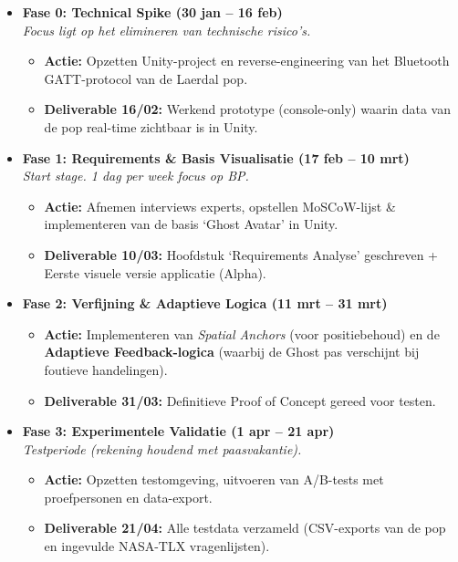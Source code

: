 \begin{itemize}
    \item \textbf{Fase 0: Technical Spike (30 jan -- 16 feb)} \\
    \textit{Focus ligt op het elimineren van technische risico's.}
    \begin{itemize}
        \item \textbf{Actie:} Opzetten Unity-project en reverse-engineering van het Bluetooth GATT-protocol van de Laerdal pop.
        \item \textbf{Deliverable 16/02:} Werkend prototype (console-only) waarin data van de pop real-time zichtbaar is in Unity.
    \end{itemize}

    \item \textbf{Fase 1: Requirements \& Basis Visualisatie (17 feb -- 10 mrt)} \\
    \textit{Start stage. 1 dag per week focus op BP.}
    \begin{itemize}
        \item \textbf{Actie:} Afnemen interviews experts, opstellen MoSCoW-lijst \& implementeren van de basis `Ghost Avatar' in Unity.
        \item \textbf{Deliverable 10/03:} Hoofdstuk `Requirements Analyse' geschreven + Eerste visuele versie applicatie (Alpha).
    \end{itemize}

    \item \textbf{Fase 2: Verfijning \& Adaptieve Logica (11 mrt -- 31 mrt)}
    \begin{itemize}
        \item \textbf{Actie:} Implementeren van \textit{Spatial Anchors} (voor positiebehoud) en de \textbf{Adaptieve Feedback-logica} (waarbij de Ghost pas verschijnt bij foutieve handelingen).
        \item \textbf{Deliverable 31/03:} Definitieve Proof of Concept gereed voor testen.
    \end{itemize}

    \item \textbf{Fase 3: Experimentele Validatie (1 apr -- 21 apr)} \\
    \textit{Testperiode (rekening houdend met paasvakantie).}
    \begin{itemize}
        \item \textbf{Actie:} Opzetten testomgeving, uitvoeren van A/B-tests met proefpersonen en data-export.
        \item \textbf{Deliverable 21/04:} Alle testdata verzameld (CSV-exports van de pop en ingevulde NASA-TLX vragenlijsten).
    \end{itemize}


\end{itemize}
